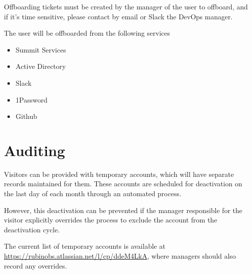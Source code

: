 Offboarding tickets must be created by the manager of the user to offboard, and if it's time sensitive, please contact by email or Slack the DevOps manager.

The user will be offboarded from the following services

\begin{itemize}
  \item Summit Services
  \item Active Directory
  \item Slack
  \item 1Password
  \item Github
\end{itemize}

\section{Auditing}

Visitors can be provided with temporary accounts, which will have separate records maintained for them. These accounts are scheduled for deactivation on the last day of each month through an automated process.

However, this deactivation can be prevented if the manager responsible for the visitor explicitly overrides the process to exclude the account from the deactivation cycle.

The current list of temporary accounts is available at \href{https://rubinobs.atlassian.net/l/cp/ddeM4LkA}{https://rubinobs.atlassian.net/l/cp/ddeM4LkA}, where managers should also record any overrides.


